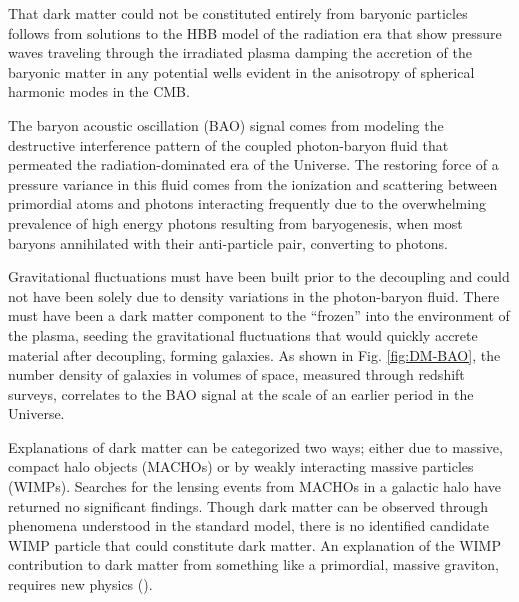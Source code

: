 \documentclass{paper}
\begin{document}
  That dark matter could not be constituted entirely from baryonic particles
  follows from 
  solutions to the HBB model of the radiation era that show 
  pressure waves traveling through the irradiated plasma damping the
  accretion of the baryonic matter in any potential wells evident in the 
  anisotropy of spherical harmonic modes in the CMB.

  The baryon acoustic oscillation (BAO) signal comes from modeling the destructive
  interference pattern of the coupled photon-baryon fluid that permeated the
  radiation-dominated era of the Universe. The restoring force of a pressure
  variance in this fluid comes from the ionization and scattering between
  primordial atoms and photons interacting frequently due to the overwhelming
  prevalence of high energy photons resulting from baryogenesis, when most 
  baryons annihilated with their anti-particle pair, converting to photons.

  Gravitational fluctuations must have been built prior to the decoupling and 
  could not have been solely due to density variations in the photon-baryon 
  fluid.  There must have been a dark matter component to the ``frozen'' into 
  the environment of the plasma, seeding the gravitational fluctuations that 
  would quickly accrete material after decoupling, forming galaxies.
  As shown in Fig. \ref{fig:DM-BAO}, the number 
  density of galaxies in volumes of space, measured through redshift surveys, 
  correlates to the BAO signal at the scale of an earlier period in the 
  Universe.

  Explanations of dark matter can be categorized two ways; either due to 
  massive, compact halo objects (MACHOs) or by weakly interacting massive 
  particles (WIMPs). Searches for the lensing events from MACHOs in a galactic 
  halo have returned no significant findings. Though dark matter can be 
  observed through phenomena understood in the standard model, there is 
  no identified candidate WIMP particle that could constitute dark matter. An 
  explanation of the WIMP contribution to dark matter from something like a 
  primordial, massive graviton, requires new physics 
  (\cite{PhysRevLett.128.081806}).
\end{document}
